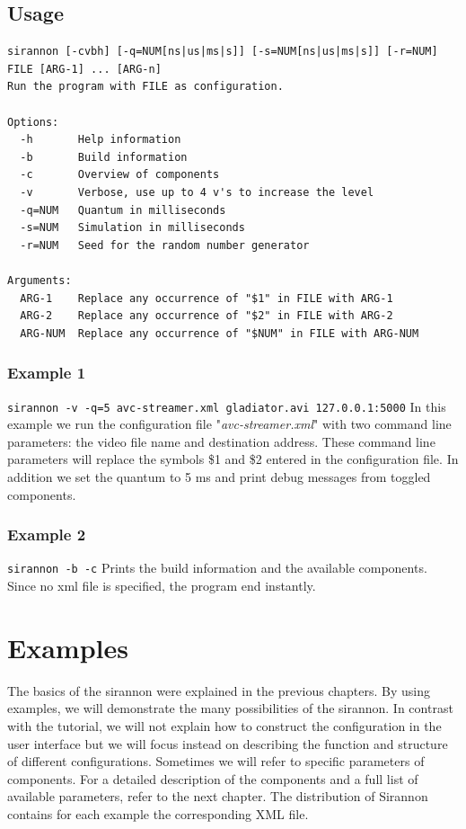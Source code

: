 \documentclass[12pt]{report}
\begin{document}
\section{Usage}
\begin{verbatim}
sirannon [-cvbh] [-q=NUM[ns|us|ms|s]] [-s=NUM[ns|us|ms|s]] [-r=NUM] FILE [ARG-1] ... [ARG-n]
Run the program with FILE as configuration.

Options:
  -h       Help information
  -b       Build information
  -c       Overview of components
  -v       Verbose, use up to 4 v's to increase the level
  -q=NUM   Quantum in milliseconds
  -s=NUM   Simulation in milliseconds
  -r=NUM   Seed for the random number generator

Arguments:
  ARG-1    Replace any occurrence of "$1" in FILE with ARG-1
  ARG-2    Replace any occurrence of "$2" in FILE with ARG-2
  ARG-NUM  Replace any occurrence of "$NUM" in FILE with ARG-NUM\end{verbatim}

\subsection{Example 1}
\texttt{sirannon -v -q=5 avc-streamer.xml gladiator.avi 127.0.0.1:5000}\newline
In this example we run the configuration file "\textit{avc-streamer.xml}" with two command line parameters: the video file name and destination address. These command line parameters will replace the symbols \$1 and \$2 entered in the configuration file. In addition we set the quantum to 5 ms and print debug messages from toggled components.

\subsection{Example 2}
\texttt{sirannon -b -c}\newline
Prints the build information and the available components. Since no xml file is specified, the program end instantly.


\chapter{Examples}
\label{chap:ex}
The basics of the sirannon were explained in the previous chapters. By using examples, we will demonstrate the many possibilities of the sirannon. In contrast with the tutorial, we will not explain how to construct the configuration in the user interface but we will focus instead on describing the function and structure of different configurations. Sometimes we will refer to specific parameters of components. For a detailed description of the components and a full list of available parameters, refer to the next chapter. The distribution of Sirannon contains for each example the corresponding XML file.
\end{document}
